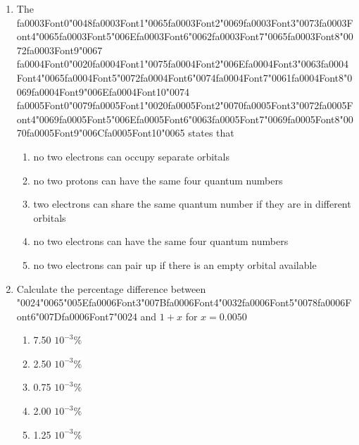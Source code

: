 \documentclass[12pt]{article}
\begin{document}
\begin{enumerate}[label=\arabic*.]
\begin{enumerate}[label=(\alph*)]
    \item SO2
    \item BeCl2
    \item SF6
    \item CBr4
    \item PCl4F
\end{enumerate}
\item The {\csname fa0003Font0\endcsname\char"0048}{\csname fa0003Font1\endcsname\char"0065}{\csname fa0003Font2\endcsname\char"0069}{\csname fa0003Font3\endcsname\char"0073}{\csname fa0003Font4\endcsname\char"0065}{\csname fa0003Font5\endcsname\char"006E}{\csname fa0003Font6\endcsname\char"0062}{\csname fa0003Font7\endcsname\char"0065}{\csname fa0003Font8\endcsname\char"0072}{\csname fa0003Font9\endcsname\char"0067} {\csname fa0004Font0\endcsname\char"0020}{\csname fa0004Font1\endcsname\char"0075}{\csname fa0004Font2\endcsname\char"006E}{\csname fa0004Font3\endcsname\char"0063}{\csname fa0004Font4\endcsname\char"0065}{\csname fa0004Font5\endcsname\char"0072}{\csname fa0004Font6\endcsname\char"0074}{\csname fa0004Font7\endcsname\char"0061}{\csname fa0004Font8\endcsname\char"0069}{\csname fa0004Font9\endcsname\char"006E}{\csname fa0004Font10\endcsname\char"0074} {\csname fa0005Font0\endcsname\char"0079}{\csname fa0005Font1\endcsname\char"0020}{\csname fa0005Font2\endcsname\char"0070}{\csname fa0005Font3\endcsname\char"0072}{\csname fa0005Font4\endcsname\char"0069}{\csname fa0005Font5\endcsname\char"006E}{\csname fa0005Font6\endcsname\char"0063}{\csname fa0005Font7\endcsname\char"0069}{\csname fa0005Font8\endcsname\char"0070}{\csname fa0005Font9\endcsname\char"006C}{\csname fa0005Font10\endcsname\char"0065} states that
\begin{enumerate}[label=(\alph*)]
    \item no two electrons can occupy separate orbitals
    \item no two protons can have the same four quantum numbers
    \item two electrons can share the same quantum number if they are in different orbitals
    \item no two electrons can have the same four quantum numbers
    \item no two electrons can pair up if there is an empty orbital available
\end{enumerate}
\item Calculate the percentage difference between {\char"0024}{\char"0065}{\char"005E}{\csname fa0006Font3\endcsname\char"007B}{\csname fa0006Font4\endcsname\char"0032}{\csname fa0006Font5\endcsname\char"0078}{\csname fa0006Font6\endcsname\char"007D}{\csname fa0006Font7\endcsname\char"0024} and $1+x$ for $x=0.0050$
\begin{enumerate}[label=(\alph*)]
    \item 7.50 $10^{-3} \%$
    \item 2.50 $10^{-3} \%$
    \item 0.75 $10^{-3} \%$
    \item 2.00 $10^{-3} \%$
    \item 1.25 $10^{-3} \%$
\end{enumerate}
\end{enumerate}
\end{document}
